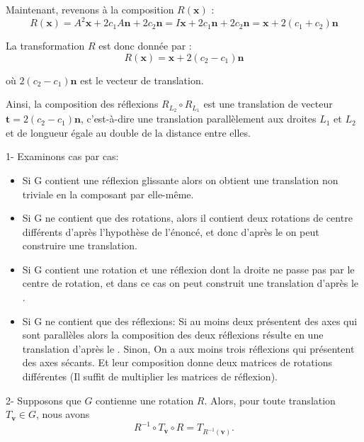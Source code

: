 Maintenant, revenons {\`a} la composition $R (\mathbf{x})$ :
\[ R (\mathbf{x}) = A^2 \mathbf{x} + 2 c_1 A \mathbf{n} + 2 c_2 \mathbf{n} = I
   \mathbf{x} + 2 c_1 \mathbf{n} + 2 c_2 \mathbf{n} = \mathbf{x} + 2 (c_1 +
   c_2) \mathbf{n} \]


La transformation $R$ est donc donn{\'e}e par :
\[ R (\mathbf{x}) = \mathbf{x} + 2 (c_2 - c_1) \mathbf{n} \]


o{\`u} $2 (c_2 - c_1) \mathbf{n}$ est le vecteur de translation.

Ainsi, la composition des r{\'e}flexions $R_{L_2} \circ R_{L_1}$ est une
translation de vecteur $\mathbf{t} = 2 (c_2 - c_1) \mathbf{n}$,
c'est-{\`a}-dire une translation parall{\`e}lement aux droites $L_1$ et $L_2$
et de longueur {\'e}gale au double de la distance entre elles.

1- Examinons cas par cas:
\begin{itemize}
  \item Si G contient une r{\'e}flexion glissante alors on obtient une
  translation non triviale en la composant par elle-m{\^e}me.
  
  \item Si G ne contient que des rotations, alors il contient deux rotations
  de centre diff{\'e}rents d'apr{\`e}s l'hypoth{\`e}se de l'{\'e}nonc{\'e}, et
  donc d'apr{\`e}s le  on peut construire une translation.
  
  \item Si G contient une rotation et une r{\'e}flexion dont la droite ne
  passe pas par le centre de rotation, et dans ce cas on peut construit une
  translation d'apr{\`e}s le .
  
  \item Si G ne contient que des r{\'e}flexions: Si au moins deux
  pr{\'e}sentent des axes qui sont parall{\`e}les alors la composition des
  deux r{\'e}flexions r{\'e}sulte en une translation d'apr{\`e}s le
  . Sinon, On a aux moins trois r{\'e}flexions qui
  pr{\'e}sentent des axes s{\'e}cants. Et leur composition donne deux matrices
  de rotations diff{\'e}rentes (Il suffit de multiplier les matrices de
  r{\'e}flexion).
\end{itemize}


2- Supposons que $G$ contienne une rotation $R$. Alors, pour toute translation
$T_{\mathbf{v}} \in G$, nous avons
\[ R^{- 1} \circ T_{\mathbf{v}} \circ R = T_{R^{- 1} (\mathbf{v})} . \]


\

